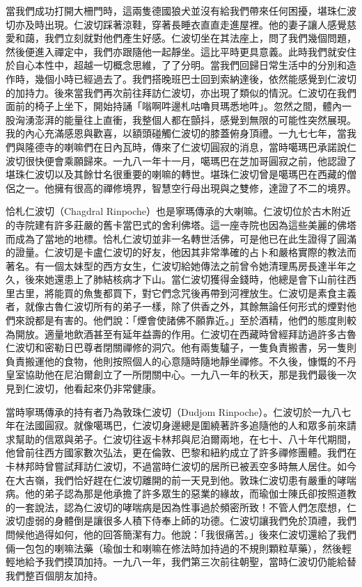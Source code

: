 當我們成功打開大柵門時，這兩隻德國狼犬並沒有給我們帶來任何困擾，堪珠仁波切亦及時出現。仁波切踩著涼鞋，穿著長睡衣直直走進屋裡。他的妻子讓人感覺慈愛和藹，我們立刻就對他們產生好感。仁波切坐在其法座上，問了我們幾個問題，然後便進入禪定中，我們亦跟隨他一起靜坐。這比平時更具意義。此時我們就安住於自心本性中，超越一切概念思維，了了分明。當我們回歸日常生活中的分別和造作時，幾個小時已經過去了。我們搭晚班巴士回到索納達後，依然能感覺到仁波切的加持力。後來當我們再次前往拜訪仁波切，亦出現了類似的情況。仁波切在我們面前的椅子上坐下，開始持誦「嗡啊吽邊札咕嚕貝瑪悉地吽」。忽然之間，體內一股洶湧澎湃的能量往上直衝，我整個人都在顫抖，感覺到無限的可能性突然展現。我的內心充滿感恩與歡喜，以額頭碰觸仁波切的膝蓋俯身頂禮。一九七七年，當我們與隆德寺的喇嘛們在日內瓦時，傳來了仁波切圓寂的消息，當時噶瑪巴承諾說仁波切很快便會乘願歸來。一九八一年十一月，噶瑪巴在芝加哥圓寂之前，他認證了堪珠仁波切以及其餘廿名很重要的喇嘛的轉世。堪珠仁波切曾是噶瑪巴在西藏的僧侶之一。他擁有很高的禪修境界，智慧空行母出現與之雙修，達證了不二的境界。

恰札仁波切（Chagdral
Rinpoche）也是寧瑪傳承的大喇嘛。仁波切位於古木附近的寺院建有許多莊嚴的舊卡當巴式的舍利佛塔。這一座寺院也因為這些美麗的佛塔而成為了當地的地標。恰札仁波切並非一名轉世活佛，可是他已在此生證得了圓滿的證量。仁波切是卡盧仁波切的好友，他因其非常準確的占卜和嚴格實際的教法而著名。有一個太妹型的西方女生，仁波切給她傳法之前曾令她清理馬房長達半年之久，後來她還患上了肺結核病才下山。當仁波切獲得金錢時，他總是會下山前往西里古里，將能買的魚隻都買下，對它們念咒後再帶到河裡放生。仁波切是素食主義者，就像古魯仁波切所有的弟子一樣，除了供香之外，其餘無論任何形式的煙對他們來說都是有害的。他們說：「煙會使諸佛不願靠近。」至於酒精，他們的態度則較為開放。適量地飲酒甚至有延年益壽的作用。仁波切在西藏時曾經拜訪過許多古魯仁波切和密勒日巴尊者閉關禪修的洞穴。他有兩隻驢子，一隻負責搬書，另一隻則負責搬運他的食物，他則按照個人的心意隨時隨地靜坐禪修。不久後，慷慨的不丹皇室協助他在尼泊爾創立了一所閉關中心。一九八一年的秋天，那是我們最後一次見到仁波切，他看起來仍非常健康。

當時寧瑪傳承的持有者乃為敦珠仁波切（Dudjom
Rinpoche）。仁波切於一九八七年在法國圓寂。就像噶瑪巴，仁波切身邊總是圍繞著許多追隨他的人和眾多前來請求幫助的信眾與弟子。仁波切往返卡林邦與尼泊爾兩地，在七十、八十年代期間，他曾前往西方國家數次弘法，更在倫敦、巴黎和紐約成立了許多禪修團體。我們在卡林邦時曾嘗試拜訪仁波切，不過當時仁波切的居所已被丟空多時無人居住。如今在大吉嶺，我們恰好趕在仁波切離開的前一天見到他。敦珠仁波切患有嚴重的哮喘病。他的弟子認為那是他承擔了許多眾生的惡業的緣故，而瑜伽士陳氏卻按照道教的一套說法，認為仁波切的哮喘病是因為性事過於頻密所致！不管人們怎麼想，仁波切虛弱的身體倒是讓很多人積下侍奉上師的功德。仁波切讓我們免於頂禮，我們問候他過得如何，他的回答簡潔有力。他說：「我很痛苦。」後來仁波切還給了我們倆一包包的喇嘛法藥（瑜伽士和喇嘛在修法時加持過的不規則顆粒草藥），然後輕輕地給予我們摸頂加持。一九八一年，我們第三次前往朝聖，當時仁波切仍能給替我們整百個朋友加持。

